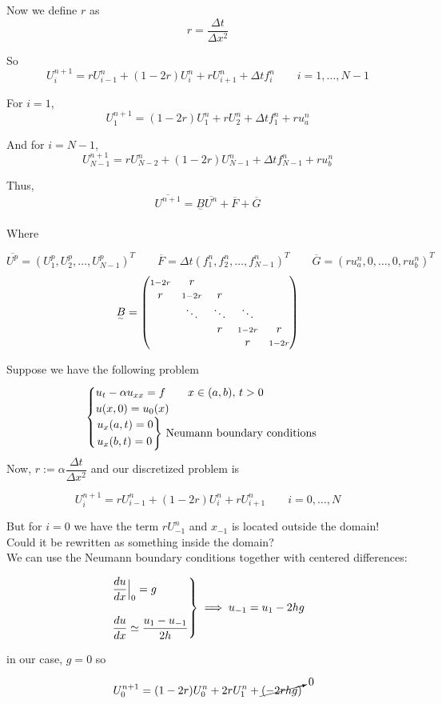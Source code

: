 Now we define $r$ as $$r = \frac{\Delta t}{\Delta x^2}$$

So $$U_i^{n+1} = rU_{i-1}^n + (1-2r)U_i^n + rU_{i+1}^n + \Delta t f_i^n \qquad i = 1,\ldots,N-1$$

For $i=1$, $$U_1^{n+1} = (1-2r)U_1^n + rU_2^n + \Delta t f_1^n + ru_a^n$$

And for $i=N-1$, $$U_{N-1}^{n+1} = rU_{N-2}^n + (1-2r)U_{N-1}^n + \Delta t f_{N-1}^n + ru_b^n$$

Thus, $$\overline{U^{n+1}} = \underset{^\sim}{B}\overline{U^n} + \overline{F} + \overline{G}$$

Where 

$$\overline{U^p} = \left(U_1^p, U_2^p, \ldots , U_{N-1}^p \right)^T \qquad \overline{F}=\Delta t\left(f_1^n, f_2^n, \ldots,f_{N-1}^n \right)^T \qquad \overline{G} = \left(ru_a^n, 0, \ldots,0,ru_b^n \right)^T$$
$$
  \underset{^\sim}{B} = 
  \begin{pmatrix}
    \scriptstyle\small{1-2r} & r \\
    r    & \scriptstyle\small{1-2r} & r \\
         & \ddots & \ddots & \ddots \\
         &        & r & \scriptstyle\small{1-2r} & r \\
         &        &   & r    & \scriptstyle\small{1-2r}
  \end{pmatrix}
$$

\newpage

\begin{example}
  Suppose we have the following problem
  $$
  \begin{cases}
    u_t-\alpha u_{xx} = f \qquad x\in (a,b),\, t>0\\
    u(x,0) = u_0(x)\\
    \begin{rcases}
        u_x(a,t)=0\\
        u_x(b,t)=0
    \end{rcases}\,\text{Neumann boundary conditions}
  \end{cases}
  $$
  Now, $r:=\alpha\dfrac{\Delta t}{\Delta x^2}$ and our discretized problem is
  
  \[
    U_i^{n+1} = rU_{i-1}^n + (1-2r)U_i^n + rU_{i+1}^n \qquad i = 0,\ldots,N
  \]
  
  But for $i=0$ we have the term $rU_{-1}^n$ and $x_{-1}$ is located outside the domain! Could it be rewritten as something inside the domain?\\
  
  We can use the Neumann boundary conditions together with centered differences:
  
  $$
  \begin{rcases}
    \dfrac{du}{dx}\Big|_0 = g\\[10pt]
    \dfrac{du}{dx} \simeq \dfrac{u_1 - u_{-1}}{2h}
  \end{rcases}\implies u_{-1} = u_1 - 2hg
  $$
  
  in our case, $g=0$ so
  
  \[
    U_0^{n+1} = (1-2r)U_0^n + 2rU_1^n + \cancelto{0}{(-2rhg)}
  \]
  
\end{example}

